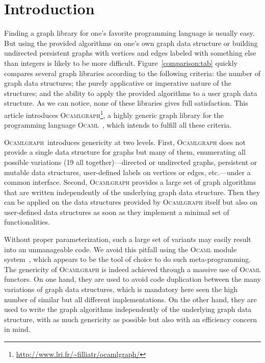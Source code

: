 \documentclass[tfpsymp]{tfp05symp}
\newcommand{\ocamlgraph}{\textsc{Ocamlgraph}\xspace}
\newcommand{\ocaml}{\textsc{Ocaml}\xspace}
\begin{document}

\section{Introduction}

Finding a graph library for one's favorite programming language is
usually easy. But using the provided algorithms on one's
own graph data structure or building undirected persistent graphs with
vertices and edges labeled with something else than integers is
likely to be more difficult. Figure~\ref{comparison:tab} quickly
compares several graph libraries according to the following criteria: 
the number of graph data structures; the purely applicative or
imperative nature of the structures; and the ability to apply the
provided algorithms to a user graph data structure.
As we can notice, none of these libraries gives full satisfaction.
This article introduces
\ocamlgraph\footnote{\url{http://www.lri.fr/~filliatr/ocamlgraph/}}, a
highly generic graph library for the programming language
\ocaml~\cite{ObjectiveCaml}, which intends to fulfill all 
these criteria.

\ocamlgraph\ introduces genericity at two levels. First, \ocamlgraph
does not provide a single data structure for graphs but many of them,
enumerating all possible variations (19 all together)---directed or
undirected graphs, persistent or mutable data structures, user-defined
labels on vertices or edges, etc.---under a common interface.  Second,
\ocamlgraph provides a large set of graph algorithms that are written
independently of the underlying graph data structure. Then they can be
applied on the data structures provided by \ocamlgraph itself but also
on user-defined data structures as soon as they implement a minimal
set of functionalities.

Without proper parameterization, such a large set of variants may
easily result into an unmanageable code. We avoid this pitfall using
the \ocaml module system~\cite{leroy00}, which appears to be the tool
of choice to do such meta-programming.  The genericity of \ocamlgraph
is indeed achieved through a massive use of \ocaml functors. On one
hand, they are used to avoid code duplication between the many
variations of graph data structures, which is mandatory here seen the
high number of similar but all different implementations. On the other
hand, they are used to write the graph algorithms independently of the
underlying graph data structure, with as much genericity as possible
but also with an efficiency concern in mind.
\end{document}
